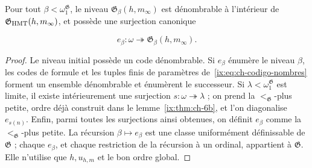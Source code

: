\begin{lemma}
\label{ix:thm:ch-7}
Pour tout \(\beta<\omega_1^{\mathfrak G}\), le niveau \(\mathfrak G_\beta(h,m_\infty)\) est dénombrable à l'intérieur de \(\mathfrak G_{\rm HMT}(h,m_\infty)\), et possède une surjection canonique

\[
 e_\beta:\omega\twoheadrightarrow
 \mathfrak G_\beta(h,m_\infty).
\tag{43}\label{ix:eq:ch-enumeracion-niveles}
\]

\end{lemma}
\begin{proof}
Le niveau initial possède un code dénombrable. Si \(e_\beta\) énumère le niveau \(\beta\), les codes de formule et les tuples finis de paramètres de~\eqref{ix:eq:ch-codigo-nombres} forment un ensemble dénombrable et énumèrent le successeur. Si \(\lambda<\omega_1^{\mathfrak G}\) est limite, il existe intérieurement une surjection \(s:\omega\twoheadrightarrow\lambda\) ; on prend la \(<_{\mathfrak G}\)-plus petite, ordre déjà construit dans le lemme~\ref{ix:thm:ch-6b}, et l'on diagonalise \(e_{s(n)}\). Enfin, parmi toutes les surjections ainsi obtenues, on définit \(e_\beta\) comme la \(<_{\mathfrak G}\)-plus petite. La récursion \(\beta\mapsto e_\beta\) est une classe uniformément définissable de \(\mathfrak G\) ; chaque \(e_\beta\), et chaque restriction de la récursion à un ordinal, appartient à \(\mathfrak G\). Elle n'utilise que \(h,u_{h,m}\) et le bon ordre global.
\end{proof}

